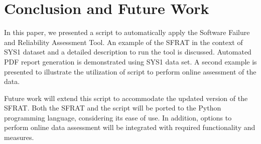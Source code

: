 \documentclass[conference]{IEEEtran}
\begin{document}




\section{Conclusion and Future Work}\label{sec:Concl}
In this paper, we presented a script to automatically apply the Software Failure and Reliability Assessment Tool. An example of the SFRAT in the context of SYS1 dataset and a detailed description to run the tool is discussed. Automated PDF report generation is demonstrated using SYS1 data set. A second example is presented to illustrate the utilization of script to perform online assessment of the data. 

Future work will extend this script to accommodate the updated version of the SFRAT. Both the SFRAT and the script will be ported to the Python programming language, considering its ease of use. In addition, options to perform online data assessment will be integrated with required functionality and measures.
\end{document}
